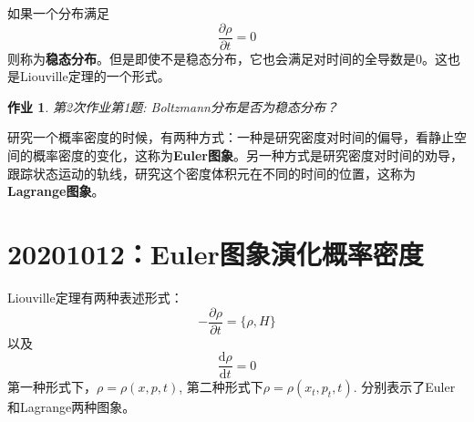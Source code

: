 \documentclass[12pt]{article}
\newtheorem{asg}{作业}
\begin{document}
    如果一个分布满足
    \begin{equation}
        \frac {\partial \rho}{\partial t} = 0
    \end{equation}
    则称为\textbf{稳态分布}。但是即使不是稳态分布，它也会满足对时间的全导数是0。这也是Liouville定理的一个形式。
    \begin{asg}
        第2次作业第1题: Boltzmann分布是否为稳态分布？
    \end{asg}

    研究一个概率密度的时候，有两种方式：一种是研究密度对时间的偏导，看静止空间的概率密度的变化，这称为\textbf{Euler图象}。另一种方式是研究密度对时间的劝导，跟踪状态运动的轨线，研究这个密度体积元在不同的时间的位置，这称为\textbf{Lagrange图象}。

\section{20201012：Euler图象演化概率密度}

    Liouville定理有两种表述形式：
    \begin{equation}
        -\frac {\partial \rho}{\partial t} = \{ \rho,H \}
    \end{equation}
    以及 
    \begin{equation}
        \frac {\mathrm{d}\rho}{\mathrm{d}t} = 0
    \end{equation}
    第一种形式下，$\rho = \rho(x, p ,t)$, 第二种形式下$\rho = \rho(x_t,p_t,t)$. 分别表示了Euler和Lagrange两种图象。
\end{document}
